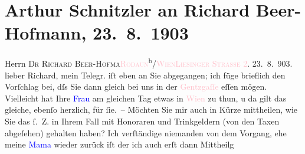 

               \section[Arthur Schnitzler an Richard Beer-Hofmann, 23. 8. 1903]{ Arthur Schnitzler an Richard Beer-Hofmann, 23. 8. 1903}\nopagebreak{}\rehead{ }\normalsize\beginnumbering{} \toendnotes[C]{\smallbreak\pagebreak[2]} 
\toendnotes[C]{\smallbreak}\pstart{}{\pb}Herrn \textsc{Dr Richard }\pend{}\pstart{}\textsc{Beer-Hofma{\geminationn}}\pend{}\pstart{}\textcolor{pink}{\textsc{Rodaun}}{}\ledrightnote{\textcolor{pink}{Rodaun}}{ }\textsuperscript{b}/\textcolor{pink}{\textsc{Wien}}{}\ledrightnote{\textcolor{pink}{Wien}}\pend{}\pstart{}\textsc{\textcolor{pink}{Liesinger Straße 2}{}\ledrightnote{\textcolor{pink}{Liesingerstraße}}.}\pend{}{\bigskip}\pstart
           \raggedleft{}{\pb}23. 8. 903. \pend
           \pstart
           lieber Richard, mein Telegr. iſt eben an Sie abgegangen; ich füge
               brieflich den Vorſchlag bei, dſs Sie dann gleich bei uns in der \textcolor{pink}{Gentzgaſſe}{}\ledrightnote{\textcolor{pink}{Gentzgasse}} eſſen mögen. Vielleicht hat Ihre \textcolor{blue}{Frau}{} am gleichen Tag etwas in \textcolor{pink}{Wien}{}\ledrightnote{\textcolor{pink}{Wien}} zu thun, u da{\geminationn} gilt das
               gleiche, ebenſo herzlich, für ſie. –\pend
           \pstart
           Möchten Sie mir auch in Kürze mittheilen, wie {\pb}Sie das
               ſ. Z. in Ihrem Fall mit Honoraren und Trinkgeldern (von den Taxen abgeſehen) gehalten
               haben?\pend
           \pstart
           Ich verſtändige niemanden von dem Vorgang, ehe meine \textcolor{blue}{Mama}{} wieder zurück iſt der ich auch erſt dann Mittheilg
